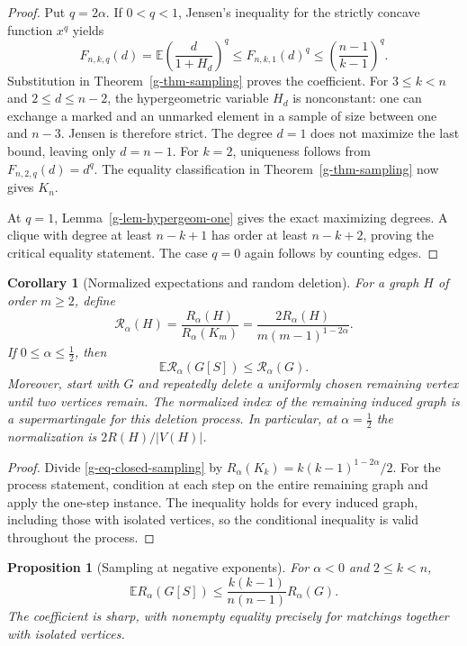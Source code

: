 \documentclass[11pt,a4paper]{article}
\newtheorem{proposition}[theorem]{Proposition}
\newtheorem{corollary}[theorem]{Corollary}
\theoremstyle{definition}
\theoremstyle{remark}
\begin{document}
\begin{proof}
Put $q=2\alpha$.  If $0<q<1$, Jensen's inequality for the strictly
concave function $x^q$ yields
\[
 F_{n,k,q}(d)
 =\mathbb E\left(\frac d{1+H_d}\right)^q
 \le F_{n,k,1}(d)^q
 \le\left(\frac{n-1}{k-1}\right)^q.
\]
Substitution in Theorem~\ref{g-thm-sampling} proves the coefficient.
For $3\le k<n$ and $2\le d\le n-2$, the hypergeometric variable $H_d$
is nonconstant: one can exchange a marked and an unmarked element in
a sample of size between one and $n-3$.  Jensen is therefore strict.
The degree $d=1$ does not maximize the last bound, leaving only $d=n-1$.
For $k=2$, uniqueness follows from $F_{n,2,q}(d)=d^q$.  The equality
classification in Theorem~\ref{g-thm-sampling} now gives $K_n$.

At $q=1$, Lemma~\ref{g-lem-hypergeom-one} gives the exact maximizing
degrees.  A clique with degree at least $n-k+1$ has order at least
$n-k+2$, proving the critical equality statement.  The case $q=0$
again follows by counting edges.
\end{proof}

\begin{corollary}[Normalized expectations and random deletion]
\label{g-cor-normalized}
For a graph $H$ of order $m\ge2$, define
\[
 \mathcal R_\alpha(H)=
 \frac{R_\alpha(H)}{R_\alpha(K_m)}
 =\frac{2R_\alpha(H)}{m(m-1)^{1-2\alpha}}.
\]
If $0\le\alpha\le\tfrac12$, then
\begin{equation}
 \mathbb E\mathcal R_\alpha(G[S])\le\mathcal R_\alpha(G).
 \label{g-eq-normalized-expectation}
\end{equation}
Moreover, start with $G$ and repeatedly delete a uniformly chosen
remaining vertex until two vertices remain.  The normalized index of the
remaining induced graph is a supermartingale for this deletion process.
In particular, at $\alpha=\tfrac12$ the normalization is $2R(H)/|V(H)|$.
\end{corollary}

\begin{proof}
Divide \eqref{g-eq-closed-sampling} by
$R_\alpha(K_k)=k(k-1)^{1-2\alpha}/2$.  For the process statement,
condition at each step on the entire remaining graph and apply the
one-step instance.  The inequality holds for every induced graph,
including those with isolated vertices, so the conditional inequality
is valid throughout the process.
\end{proof}

\begin{proposition}[Sampling at negative exponents]
\label{g-prop-negative-sampling}
For $\alpha<0$ and $2\le k<n$,
\[
 \mathbb E R_\alpha(G[S])\le
 \frac{k(k-1)}{n(n-1)}R_\alpha(G).
\]
The coefficient is sharp, with nonempty equality precisely for matchings
together with isolated vertices.
\end{proposition}
\end{document}
